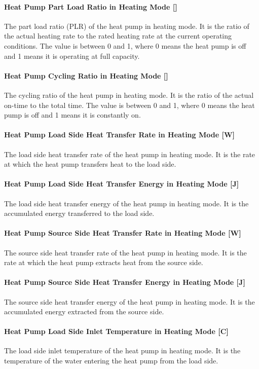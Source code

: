\paragraph{Heat Pump Part Load Ratio in Heating Mode {[}{]}} The part load ratio
(PLR) of the heat pump in heating mode. It is the ratio of the actual heating
rate to the rated heating rate at the current operating conditions. The value is
between 0 and 1, where 0 means the heat pump is off and 1 means it is operating
at full capacity.
\paragraph{Heat Pump Cycling Ratio in Heating Mode {[}{]}} The cycling ratio of
the heat pump in heating mode. It is the ratio of the actual on-time to the
total time. The value is between 0 and 1, where 0 means the heat pump is off and
1 means it is constantly on.
\paragraph{Heat Pump Load Side Heat Transfer Rate in Heating Mode {[}W{]}} The
load side heat transfer rate of the heat pump in heating mode. It is the rate at
which the heat pump transfers heat to the load side.
\paragraph{Heat Pump Load Side Heat Transfer Energy in Heating Mode {[}J{]}} The
load side heat transfer energy of the heat pump in heating mode. It is the
accumulated energy transferred to the load side.
\paragraph{Heat Pump Source Side Heat Transfer Rate in Heating Mode {[}W{]}} The
source side heat transfer rate of the heat pump in heating mode. It is the rate
at which the heat pump extracts heat from the source side.
\paragraph{Heat Pump Source Side Heat Transfer Energy in Heating Mode {[}J{]}}
The source side heat transfer energy of the heat pump in heating mode. It is the
accumulated energy extracted from the source side.
\paragraph{Heat Pump Load Side Inlet Temperature in Heating Mode {[}C{]}} The
load side inlet temperature of the heat pump in heating mode. It is the
temperature of the water entering the heat pump from the load side.
